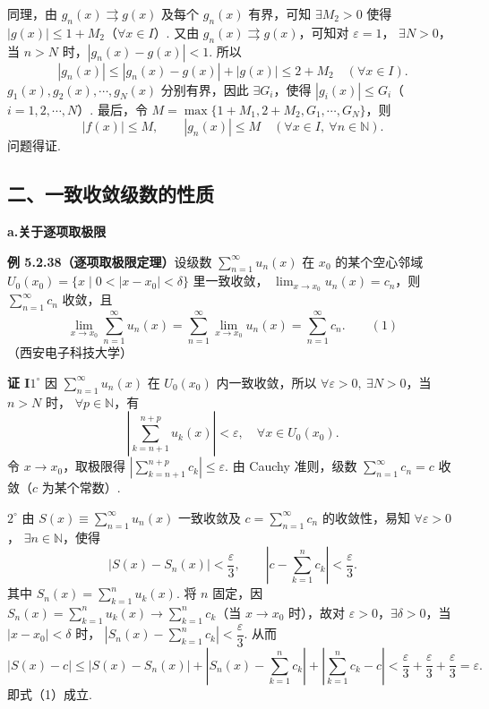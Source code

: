 \documentclass[UTF8, 12pt, fontset=fandol, oneside]{ctexart}
\begin{document}
同理，由 $g_n(x)\rightrightarrows g(x)$ 及每个 $g_n(x)$ 有界，可知
$\exists M_2>0$ 使得 $|g(x)|\le1+M_2$（$\forall x\in I$）. 又由
$g_n(x)\rightrightarrows g(x)$，可知对 $\varepsilon=1$，
$\exists N>0$，当 $n>N$ 时，$|g_n(x)-g(x)|<1$. 所以
\[
  |g_n(x)|\le |g_n(x)-g(x)|+|g(x)|\le2+M_2\quad(\forall x\in I).
\]
$g_1(x),g_2(x),\cdots,g_N(x)$ 分别有界，因此 $\exists G_i$，使得
$|g_i(x)|\le G_i$（$i=1,2,\cdots,N$）. 最后，令
$M=\max\{1+M_1,2+M_2,G_1,\cdots,G_N\}$，则
\[
  |f(x)|\le M,\qquad |g_n(x)|\le M\quad(\forall x\in I,\ \forall n\in\mathbb N).
\]
问题得证.

\subsection*{二、一致收敛级数的性质}

\noindent\textbf{a.\quad 关于逐项取极限}

\noindent\textbf{例 5.2.38（逐项取极限定理）}\quad 设级数
$\displaystyle\sum_{n=1}^{\infty}u_n(x)$ 在 $x_0$ 的某个空心邻域
$U_0(x_0)=\{x\mid0<|x-x_0|<\delta\}$ 里一致收敛，
$\displaystyle\lim_{x\to x_0}u_n(x)=c_n$，则
$\displaystyle\sum_{n=1}^{\infty}c_n$ 收敛，且
\[
  \lim_{x\to x_0}\sum_{n=1}^{\infty}u_n(x)
  =\sum_{n=1}^{\infty}\lim_{x\to x_0}u_n(x)
  =\sum_{n=1}^{\infty}c_n.
\qquad(1)
\]
（西安电子科技大学）

\noindent\textbf{证 I}\quad $1^\circ$ 因 $\displaystyle\sum_{n=1}^{\infty}u_n(x)$ 在
$U_0(x_0)$ 内一致收敛，所以 $\forall\varepsilon>0,\ \exists N>0$，当 $n>N$ 时，
$\forall p\in\mathbb N$，有
\[
  \left|\sum_{k=n+1}^{n+p}u_k(x)\right|<\varepsilon,\quad \forall x\in U_0(x_0).
\]
令 $x\to x_0$，取极限得
$\left|\displaystyle\sum_{k=n+1}^{n+p}c_k\right|\le\varepsilon$. 由 Cauchy 准则，级数
$\displaystyle\sum_{n=1}^{\infty}c_n=c$ 收敛（$c$ 为某个常数）.

$2^\circ$ 由 $S(x)\equiv\displaystyle\sum_{n=1}^{\infty}u_n(x)$ 一致收敛及
$c=\displaystyle\sum_{n=1}^{\infty}c_n$ 的收敛性，易知 $\forall\varepsilon>0$，
$\exists n\in\mathbb N$，使得
\[
  |S(x)-S_n(x)|<\frac\varepsilon3,\qquad
  \left|c-\sum_{k=1}^{n}c_k\right|<\frac\varepsilon3.
\]
其中 $S_n(x)=\displaystyle\sum_{k=1}^{n}u_k(x)$. 将 $n$ 固定，因
$S_n(x)=\displaystyle\sum_{k=1}^{n}u_k(x)\to\displaystyle\sum_{k=1}^{n}c_k$（当
$x\to x_0$ 时），故对 $\varepsilon>0$，$\exists\delta>0$，当
$|x-x_0|<\delta$ 时，
$\left|S_n(x)-\displaystyle\sum_{k=1}^{n}c_k\right|<\dfrac\varepsilon3$. 从而
\[
  |S(x)-c|
  \le |S(x)-S_n(x)|
  +\left|S_n(x)-\sum_{k=1}^{n}c_k\right|
  +\left|\sum_{k=1}^{n}c_k-c\right|
  <\frac\varepsilon3+\frac\varepsilon3+\frac\varepsilon3=\varepsilon.
\]
即式（1）成立.
\end{document}
